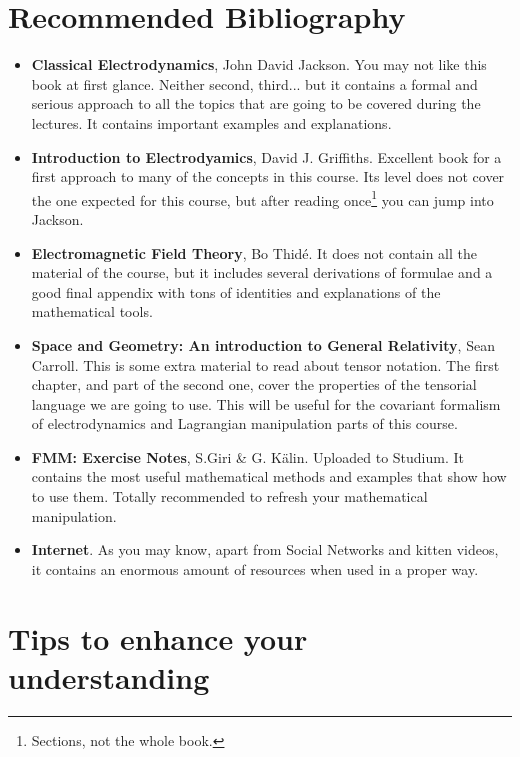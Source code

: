 \documentclass[a4paper,12pt]{article}
\begin{document}
\section*{Recommended Bibliography}
\begin{itemize}
	\item \textbf{Classical Electrodynamics}, John David Jackson. You may not like this book at first glance. Neither second, third... but it contains a formal and serious approach to all the topics that are going to be covered during the lectures. It contains important examples and explanations.
	
	\item \textbf{Introduction to Electrodyamics}, David J. Griffiths. Excellent book for a first approach to many of the concepts in this course. Its level does not cover the one expected for this course, but after reading once\footnote{Sections, not the whole book.} you can jump into Jackson.
	
	\item \textbf{Electromagnetic Field Theory}, Bo Thidé. It does not contain all the material of the course, but it includes several derivations of formulae and a good final appendix with tons of identities and explanations of the mathematical tools.
	
	\item \textbf{Space and Geometry: An introduction to General Relativity}, Sean Carroll. This is some extra material to read about tensor notation. The first chapter, and part of the second one, cover the properties of the tensorial language we are going to use. This will be useful for the covariant formalism of electrodynamics and Lagrangian manipulation parts of this course.
	
	\item \textbf{FMM: Exercise Notes}, S.Giri \& G. Kälin. Uploaded to Studium. It contains the most useful mathematical methods and examples that show how to use them. Totally recommended to refresh your mathematical manipulation.
	
	\item \textbf{Internet}. As you may know, apart from Social Networks and kitten videos, it contains an enormous amount of resources when used in a proper way.
	
\end{itemize}

\section*{Tips to enhance your understanding}
\end{document}
